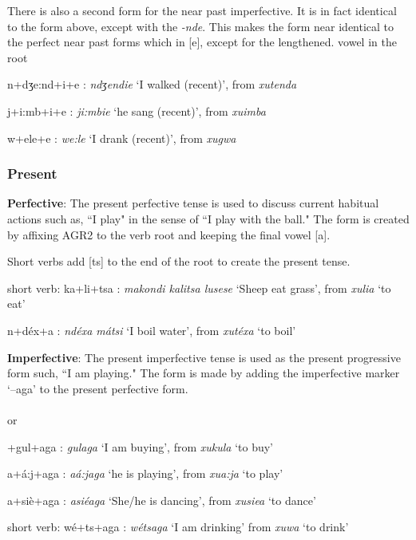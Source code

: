 There is also a second form for the near past imperfective.  It is in fact identical to the form above, except with the \emph{-nd\ezh{}e}.  This makes the form near identical to the perfect near past forms which in [e], except for the lengthened. vowel in the root

\begin{wrdex}
\item n+dʒe:nd+i+e : \emph{ndʒendie} `I walked (recent)', from \emph{xut\esh{}enda}
\item j+i:mb+i+e : \emph{ji:mbie} `he sang (recent)', from \emph{xuimba}
\item \engma{}w+ele+e : \emph{\engma{}we:le} `I drank (recent)', from \emph{xu\engma{}gwa}
\end{wrdex}

\subsubsection{Present}
\textbf{Perfective}: The present perfective tense is used to discuss current habitual actions such as, ``I play" in the sense of ``I play with the ball."  The form is created by affixing AGR2 to the verb root and keeping the final vowel [a].\\

Short verbs add [ts] to the end of the root to create the present tense.

\begin{wrdex}
\item short verb: ka+li+tsa : \emph{makondi kalitsa lusese} `Sheep eat grass', from \emph{xulia} `to eat'
\item n+d\'ex+a : \emph{nd\'exa m\'atsi} `I boil water', from \emph{xut\'exa} `to boil'
\end{wrdex}

\textbf{Imperfective}: The present imperfective tense is used as the present progressive form such, ``I am playing."  The form is made by adding the imperfective marker `--a\engma{}ga' to the present perfective form.\\
\\
or\\

\begin{wrdex}
\item \engma{}+gul+a\engma{}ga : \emph{\engma{}gula\engma{}ga} `I am buying', from \emph{xukula} `to buy'
\item a+\beta{}\'a:j+a\engma{}ga : \emph{a\beta{}\'a:ja\engma{}ga} `he is playing', from \emph{xu\beta{}a:ja} `to play'
\item a+si\`e\beta{}+a\engma{}ga : \emph{asi\'e\beta{}a\engma{}ga} `She/he is dancing', from \emph{xusie\beta{}a} `to dance'
\item short verb: \engma{}w\'e+ts+a\engma{}ga : \emph{\engma{}w\'etsa\engma{}ga} `I am drinking' from \emph{xu\engma{}wa} `to drink' 
\end{wrdex}

